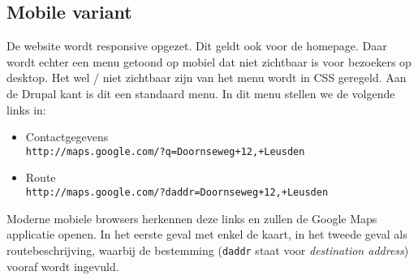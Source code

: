 \subsection{Mobile variant}\label{mobile}

De website wordt responsive opgezet. Dit geldt ook voor de homepage. Daar wordt echter een menu getoond op mobiel dat niet zichtbaar is voor bezoekers op desktop. Het wel / niet zichtbaar zijn van het menu wordt in CSS geregeld. Aan de Drupal kant is dit een standaard menu. In dit menu stellen we de volgende links in:
\begin{itemize}
\item Contactgegevens \\
\texttt{http://maps.google.com/?q=Doornseweg+12,+Leusden}
\item Route \\
\texttt{http://maps.google.com/?daddr=Doornseweg+12,+Leusden}
\end{itemize}
Moderne mobiele browsers herkennen deze links en zullen de Google Maps applicatie openen. In het eerste geval met enkel de kaart, in het tweede geval als routebeschrijving, waarbij de bestemming (\texttt{daddr} staat voor \emph{destination address}) vooraf wordt ingevuld.
